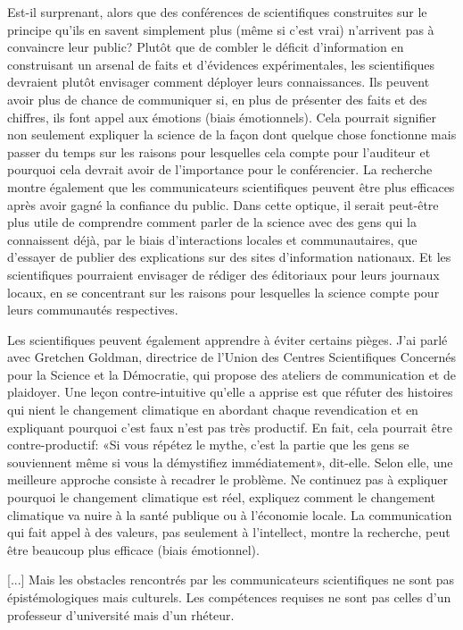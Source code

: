 	Est-il surprenant, alors que des conf\'erences de scientifiques construites sur le principe qu'ils en savent simplement plus (même si c'est vrai) n'arrivent pas à convaincre leur public? Plutôt que de combler le d\'eficit d'information en construisant un arsenal de faits et d'\'evidences exp\'erimentales, les scientifiques devraient plutôt envisager comment d\'eployer leurs connaissances. Ils peuvent avoir plus de chance de communiquer si, en plus de pr\'esenter des faits et des chiffres, ils font appel aux \'emotions (biais \'emotionnels). Cela pourrait signifier non seulement expliquer la science de la façon dont quelque chose fonctionne mais passer du temps sur les raisons pour lesquelles cela compte pour l'auditeur et pourquoi cela devrait avoir de l'importance pour le conf\'erencier. La recherche montre \'egalement que les communicateurs scientifiques peuvent être plus efficaces après avoir gagn\'e la confiance du public. Dans cette optique, il serait peut-être plus utile de comprendre comment parler de la science avec des gens qui la connaissent d\'ejà, par le biais d'interactions locales et communautaires, que d'essayer de publier des explications sur des sites d'information nationaux. Et les scientifiques pourraient envisager de r\'ediger des \'editoriaux pour leurs journaux locaux, en se concentrant sur les raisons pour lesquelles la science compte pour leurs communaut\'es respectives.

	Les scientifiques peuvent \'egalement apprendre à \'eviter certains pièges. J'ai parl\'e avec Gretchen Goldman, directrice de l'Union des Centres Scientifiques Concern\'es pour la Science et la D\'emocratie, qui propose des ateliers de communication et de plaidoyer. Une leçon contre-intuitive qu'elle a apprise est que r\'efuter des histoires qui nient le changement climatique en abordant chaque revendication et en expliquant pourquoi c'est faux n'est pas très productif. En fait, cela pourrait être contre-productif: «Si vous r\'ep\'etez le mythe, c'est la partie que les gens se souviennent même si vous la d\'emystifiez imm\'ediatement», dit-elle. Selon elle, une meilleure approche consiste à recadrer le problème. Ne continuez pas à expliquer pourquoi le changement climatique est r\'eel, expliquez comment le changement climatique va nuire à la sant\'e publique ou à l'\'economie locale. La communication qui fait appel à des valeurs, pas seulement à l'intellect, montre la recherche, peut être beaucoup plus efficace (biais \'emotionnel).

	[...] Mais les obstacles rencontr\'es par les communicateurs scientifiques ne sont pas \'epist\'emologiques mais culturels. Les comp\'etences requises ne sont pas celles d'un professeur d'universit\'e mais d'un rh\'eteur.

